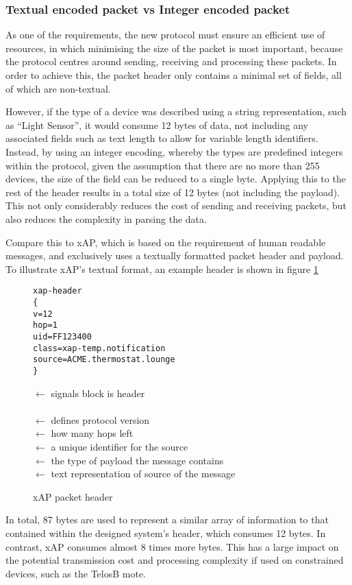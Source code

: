 
\subsubsection{Textual encoded packet vs Integer encoded packet} %
\label{ssub:textual_packet_vs_encoded_packet}
As one of the requirements, the new protocol must ensure an efficient use of resources, in which minimising the size of the packet is most important, because the protocol centres around sending, receiving and processing these packets. In order to achieve this, the packet header only contains a minimal set of fields, all of which are non-textual.

However, if the type of a device was described using a string representation, such as ``Light Sensor'', it would consume 12 bytes of data, not including any associated fields such as text length to allow for variable length identifiers. Instead, by using an integer encoding, whereby the types are predefined integers within the protocol, given the assumption that there are no more than 255 devices, the size of the field can be reduced to a single byte. Applying this to the rest of the header results in a total size of 12 bytes (not including the payload). This not only considerably reduces the cost of sending and receiving packets, but also reduces the complexity in parsing the data.

Compare this to xAP, which is based on the requirement of human readable messages, and exclusively uses a textually formatted packet header and payload. To illustrate xAP's textual format, an example header is shown in figure \ref{fig:xapHeader}
\begin{figure}[h!]
\begin{minipage}{.5\textwidth}
\begin{verbatim}
xap-header
{
v=12
hop=1
uid=FF123400
class=xap-temp.notification
source=ACME.thermostat.lounge
}
\end{verbatim}
\end{minipage}%
\begin{minipage}{.5\textwidth}
$\leftarrow$ signals block is header\\
\\
$\leftarrow$ defines protocol version\\
$\leftarrow$ how many hops left\\
$\leftarrow$ a unique identifier for the source\\
$\leftarrow$ the type of payload the message contains\\
$\leftarrow$ text representation of source of the message\\
\end{minipage}
\caption{xAP packet header}
\label{fig:xapHeader}
\end{figure}
In total, 87 bytes are used to represent a similar array of information to that contained within the designed system's header, which consumes 12 bytes. In contrast, xAP consumes almost 8 times more bytes. This has a large impact on the potential transmission cost and processing complexity if used on constrained devices, such as the TelosB mote.

